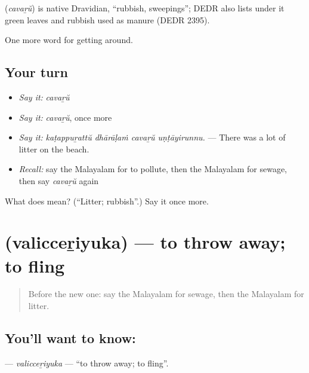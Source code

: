 \begin{cousinweb}
\textbf{} (\emph{cavaṟŭ}) is native Dravidian, \textquotedblleft{}rubbish, sweepings\textquotedblright{}; DEDR also lists under it green leaves and rubbish used as manure (DEDR 2395).
\end{cousinweb}

\begin{grammarlens}[title={What you've built}]
One more word for getting around.
\end{grammarlens}

\subsection*{Your turn}
\begin{itemize}
\raggedright
  \item \emph{Say it:} \emph{cavaṟŭ}
  \item \emph{Say it:} \emph{cavaṟŭ}, once more
  \item \emph{Say it:} \emph{kaṭappuṟattŭ dhārāḷaṁ cavaṟŭ uṇṭāyirunnu.} — There was a lot of litter on the beach.
  \item \emph{Recall:} say the Malayalam for to pollute, then the Malayalam for sewage, then say \emph{cavaṟŭ} again
\end{itemize}

\begin{tcolorbox}[breakable,colback=teal!4,colframe=teal!35!black,title={Before you move on}]
What does  mean? (\textquotedblleft{}Litter; rubbish\textquotedblright{}.) Say it once more.
\end{tcolorbox}
\section[\texorpdfstring{\ml{വലിച്ചെറിയുക} (valicceṟiyuka)}{വലിച്ചെറിയുക (valicceṟiyuka)}]{ (valicceṟiyuka) — to throw away; to fling}

\label{lesson:ML-C504-valicceriyuka}



\begin{quote}
Before the new one: say the Malayalam for sewage, then the Malayalam for litter.
\end{quote}

\subsection*{You'll want to know: }
\textbf{} — \emph{valicceṟiyuka} — \textquotedblleft{}to throw away; to fling\textquotedblright{}.


